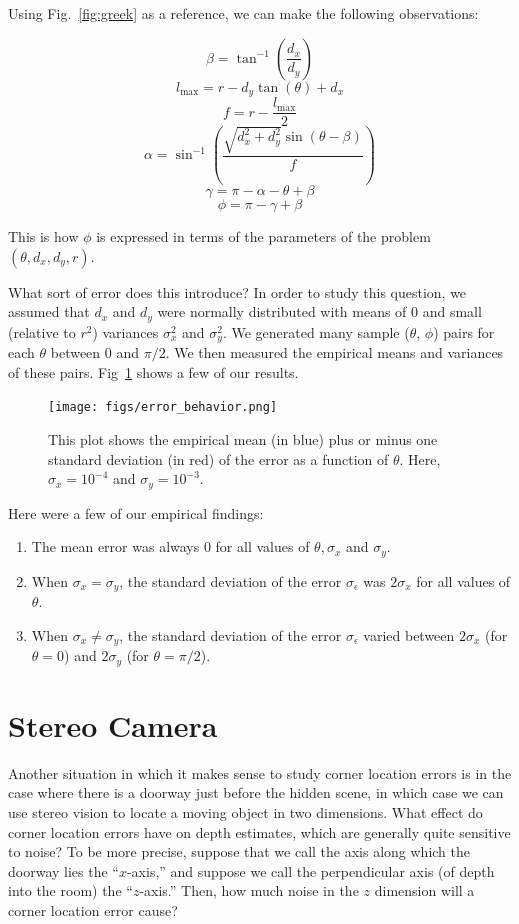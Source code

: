 \documentclass[11pt]{article}
\begin{document}
Using Fig.~\ref{fig:greek} as a reference, we can make the following observations:

$$\beta = \tan^{-1}\left(\frac{d_x}{d_y}\right)$$
$$l_{\mathrm{max}} = r - d_y \tan(\theta) + d_x$$
$$f = r - \frac{l_{\mathrm{max}}}{2}$$
$$\alpha = \sin^{-1}\left(\frac{\sqrt{d_x^2+d_y^2}\sin(\theta-\beta)}{f}\right)$$
$$\gamma = \pi - \alpha - \theta + \beta$$
$$\phi = \pi - \gamma + \beta$$

This is how $\phi$ is expressed in terms of the parameters of the problem $(\theta, d_x, d_y, r)$.

What sort of error does this introduce? In order to study this question, we assumed that $d_x$ and $d_y$ were normally distributed with means of 0 and small (relative to $r^2$) variances $\sigma_x^2$ and $\sigma_y^2$. We generated many sample ($\theta$, $\phi$) pairs for each $\theta$ between 0 and $\pi/2$. We then measured the empirical means and variances of these pairs. Fig~\ref{fig:error_behavior} shows a few of our results.

\begin{figure}
\centering
\texttt{[image: figs/error\_behavior.png]}
\caption{This plot shows the empirical mean (in blue) plus or minus one standard deviation (in red) of the error as a function of $\theta$. Here, $\sigma_x = 10^{-4}$ and $\sigma_y = 10^{-3}$. \label{fig:error_behavior}}
\end{figure}

Here were a few of our empirical findings:

\begin{enumerate}
    \item The mean error was always 0 for all values of $\theta, \sigma_x$ and $\sigma_y$.
    \item When $\sigma_x = \sigma_y$, the standard deviation of the error $\sigma_{\epsilon}$ was $2\sigma_x$ for all values of $\theta$.
    \item When $\sigma_x \not= \sigma_y$, the standard deviation of the error $\sigma_{\epsilon}$ varied between $2\sigma_x$ (for $\theta = 0$) and $2\sigma_y$ (for $\theta = \pi/2$).
\end{enumerate}

\section{Stereo Camera}

Another situation in which it makes sense to study corner location errors is in the case where there is a doorway just before the hidden scene, in which case we can use stereo vision to locate a moving object in two dimensions. What effect do corner location errors have on depth estimates, which are generally quite sensitive to noise? To be more precise, suppose that we call the axis along which the doorway lies the ``$x$-axis,'' and suppose we call the perpendicular axis (of depth into the room) the ``$z$-axis.'' Then, how much noise in the $z$ dimension will a corner location error cause?
\end{document}

